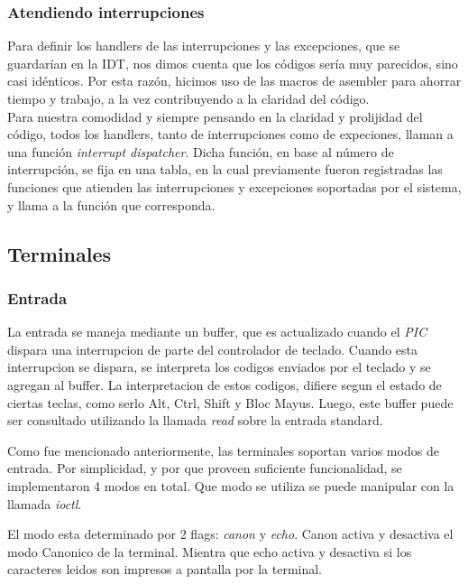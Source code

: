 \documentclass[a4paper,10pt]{article}
\begin{document}
        \subsubsection{Atendiendo interrupciones}
            Para definir los handlers de las interrupciones y las excepciones, que se guardarían en la IDT, nos dimos cuenta que los códigos sería muy parecidos,
            sino casi idénticos. Por esta razón, hicimos uso de las macros de asembler para ahorrar tiempo y trabajo, a la vez
            contribuyendo a la claridad del código.
            \\
            Para nuestra comodidad y siempre pensando en la claridad y prolijidad del código, todos los handlers, tanto de interrupciones
            como de expeciones, llaman a una función \textit{interrupt dispatcher}. Dicha función, en base al número de interrupción, se fija
            en una tabla, en la cual previamente fueron registradas las funciones que atienden las interrupciones y excepciones soportadas
            por el sistema, y llama a la función que corresponda.

    \subsection{Terminales}
        \subsubsection{Entrada}
            La entrada se maneja mediante un buffer, que es actualizado cuando el \textit{PIC} dispara una interrupcion de parte del controlador de teclado.
            Cuando esta interrupcion se dispara, se interpreta los codigos enviados por el teclado y se agregan al buffer.
            La interpretacion de estos codigos, difiere segun el estado de ciertas teclas, como serlo Alt, Ctrl, Shift y Bloc Mayus.
            Luego, este buffer puede ser consultado utilizando la llamada \textit{read} sobre la entrada standard.

            Como fue mencionado anteriormente, las terminales soportan varios modos de entrada.
            Por simplicidad, y por que proveen suficiente funcionalidad, se implementaron 4 modos en total.
            Que modo se utiliza se puede manipular con la llamada \textit{ioctl}.

            El modo esta determinado por 2 flags: \textit{canon} y \textit{echo}.
            Canon activa y desactiva el modo Canonico de la terminal.
            Mientra que echo activa y desactiva si los caracteres leidos son impresos a pantalla por la terminal.
\end{document}
